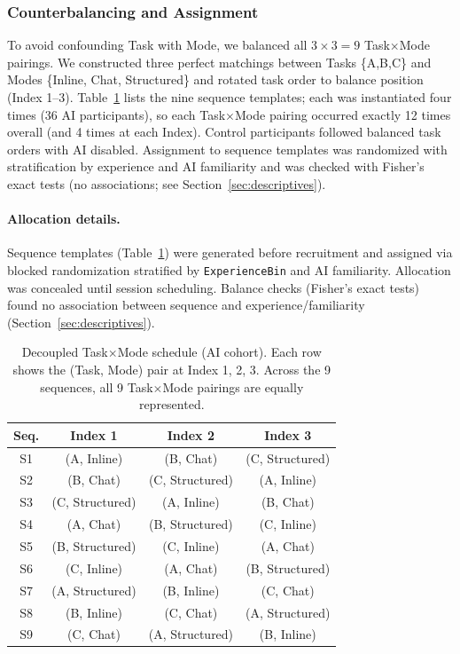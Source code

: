 \documentclass[sigconf]{acmart}
\begin{document}
\subsubsection*{Counterbalancing and Assignment}
\label{sec:counterbalance}

To avoid confounding Task with Mode, we balanced all $3\times3=9$ Task$\times$Mode pairings. We constructed three perfect matchings between Tasks \{A,B,C\} and Modes \{Inline, Chat, Structured\} and rotated task order to balance position (Index 1--3). Table~\ref{tab:pairing-schedule} lists the nine sequence templates; each was instantiated four times (36 AI participants), so each Task$\times$Mode pairing occurred exactly 12 times overall (and 4 times at each Index). Control participants followed balanced task orders with AI disabled. Assignment to sequence templates was randomized with stratification by experience and AI familiarity and was checked with Fisher's exact tests (no associations; see Section~\ref{sec:descriptives}).

\paragraph{Allocation details.}
Sequence templates (Table~\ref{tab:pairing-schedule}) were generated before recruitment and assigned via blocked randomization stratified by \texttt{ExperienceBin} and AI familiarity. Allocation was concealed until session scheduling. Balance checks (Fisher's exact tests) found no association between sequence and experience/familiarity (Section~\ref{sec:descriptives}).

\begin{table}[t]
  \centering
  \caption{Decoupled Task$\times$Mode schedule (AI cohort). Each row shows the (Task, Mode) pair at Index 1, 2, 3. Across the 9 sequences, all 9 Task$\times$Mode pairings are equally represented.}
  \label{tab:pairing-schedule}
  \small
  \begin{tabular}{c c c c}
    \toprule
    \textbf{Seq.} & \textbf{Index 1} & \textbf{Index 2} & \textbf{Index 3} \\
    \midrule
    S1 & (A, Inline) & (B, Chat) & (C, Structured) \\
    S2 & (B, Chat) & (C, Structured) & (A, Inline) \\
    S3 & (C, Structured) & (A, Inline) & (B, Chat) \\
    S4 & (A, Chat) & (B, Structured) & (C, Inline) \\
    S5 & (B, Structured) & (C, Inline) & (A, Chat) \\
    S6 & (C, Inline) & (A, Chat) & (B, Structured) \\
    S7 & (A, Structured) & (B, Inline) & (C, Chat) \\
    S8 & (B, Inline) & (C, Chat) & (A, Structured) \\
    S9 & (C, Chat) & (A, Structured) & (B, Inline) \\
    \bottomrule
  \end{tabular}
\end{table}
\end{document}
